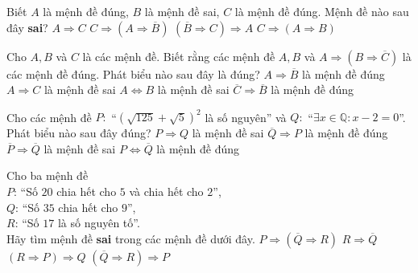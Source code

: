 \begin{ex}%
	Biết $A$ là mệnh đề đúng, $B$ là mệnh đề sai, $C$ là mệnh đề đúng. Mệnh đề nào sau đây \textbf{sai}?
	\choice 
	{ $A\Rightarrow C$}
	{ $C\Rightarrow ( A\Rightarrow \overline{B} )$ }
	{ $( \overline{B}\Rightarrow C )\Rightarrow A$ }
	{ \True $C\Rightarrow ( A\Rightarrow B )$} 
\end{ex} 
\begin{ex}%
	Cho $A, B$ và $C$ là các mệnh đề. Biết rằng các mệnh đề $A, B$ và $A \Rightarrow (B \Rightarrow \overline{C})$ là các mệnh đề đúng. Phát biểu nào sau đây là đúng?
	\choice 
	{ $A \Rightarrow \overline{B}$ là mệnh đề đúng}
	{\True $A \Rightarrow {C}$ là mệnh đề sai }
	{ $A \Leftrightarrow B$ là mệnh đề sai }
	{$\overline{C} \Rightarrow \overline{B}$ là mệnh đề đúng }
\end{ex}
\begin{ex}%
	Cho các mệnh đề $P:$ “$\left(\sqrt{125}+\sqrt{5}\right)^2$ là số nguyên” và
	$Q:$ “$\exists x \in \mathbb{Q}: x-2=0$”. Phát biểu nào sau đây đúng?
	\choice
	{$P \Rightarrow Q$ là mệnh đề sai}
	{\True $\overline{Q} \Rightarrow P$ là mệnh đề đúng}
	{$\overline{P} \Rightarrow \overline{Q}$ là mệnh đề sai}
	{$P \Leftrightarrow \overline{Q}$ là mệnh đề đúng}
\end{ex}
\begin{ex}%
	Cho ba mệnh đề\\
	$P$: “Số $20$ chia hết cho $5$ và chia hết cho $2$”,\\
	$Q$: “Số $35$ chia hết cho $9$”,\\
	$R$: “Số $17$ là số nguyên tố”.\\
	Hãy tìm mệnh đề \textbf{sai} trong các mệnh đề dưới đây.
	\choice 
	{ $P\Rightarrow ( \overline{Q}\Rightarrow R )$}
	{ $R\Rightarrow \overline{Q}$ }
	{ \True $( R\Rightarrow P )\Rightarrow Q$}
	{ $( \overline{Q}\Rightarrow R )\Rightarrow P$ }
\end{ex}
